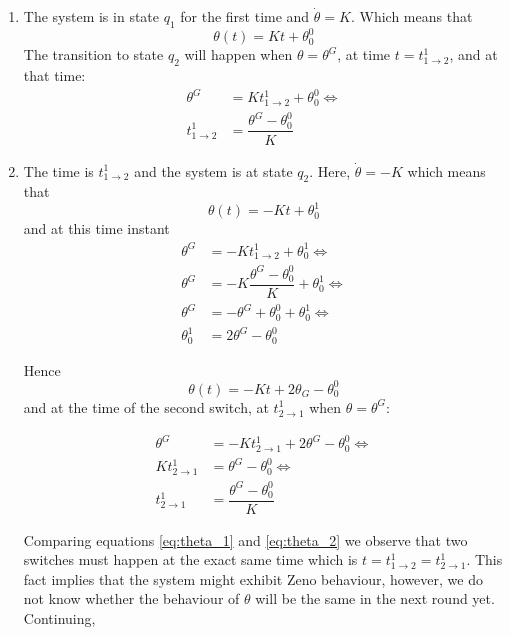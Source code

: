 \begin{enumerate}
    \item The system is in state $q_1$ for the first time and $\dot{\theta} = K$.
      Which means that
      $$\theta(t) = K t + \theta_0^0$$
      The transition to state $q_2$ will happen when $\theta =\theta^G$, at time
      $t = t_{1\rightarrow2}^1$, and at that time:
      \begin{align}
        \theta^G &= K t_{1\rightarrow2}^1 + \theta_0^0 \Leftrightarrow \nonumber \\
        t_{1\rightarrow2}^1 &= \dfrac{\theta^G - \theta_0^0}{K} \label{eq:theta_1}
      \end{align}

    \item The time is $t_{1\rightarrow2}^1$ and the system is at state $q_2$. Here,
      $\dot{\theta} = -K$ which means that
      $$\theta(t) = -K t + \theta_0^1$$
      and at this time instant
      \begin{align*}
        \theta^G &= -K t_{1\rightarrow2}^1 + \theta_0^1 \Leftrightarrow \\
        \theta^G &= -K \dfrac{\theta^G - \theta_0^0}{K} + \theta_0^1 \Leftrightarrow \\
        \theta^G &= -\theta^G + \theta_0^0 + \theta_0^1 \Leftrightarrow \\
        \theta_0^1 &= 2\theta^G - \theta_0^0
      \end{align*}


      Hence
      $$\theta(t) = -K t + 2\theta_G - \theta_0^0$$
      and at the time of the second switch, at $t_{2\rightarrow1}^1$ when $\theta = \theta^G$:

      \begin{align}
        \theta^G &= -K t_{2\rightarrow1}^1 + 2\theta^G - \theta_0^0 \Leftrightarrow \nonumber \\
        K t_{2\rightarrow1}^1 &= \theta^G - \theta_0^0 \Leftrightarrow \nonumber \\
        t_{2\rightarrow1}^1 &= \dfrac{\theta^G - \theta_0^0}{K} \label{eq:theta_2}
      \end{align}

      Comparing equations \ref{eq:theta_1} and \ref{eq:theta_2} we observe that
      two switches must happen at the exact same time which is
      $t = t_{1\rightarrow2}^1 = t_{2\rightarrow1}^1$. This fact implies that
      the system might exhibit Zeno behaviour, however, we do not know whether
      the behaviour of $\theta$ will be the same in the next round yet.
      Continuing,


\end{enumerate}
